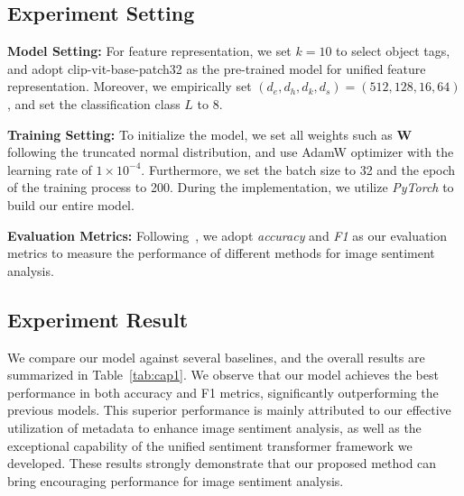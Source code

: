 \subsection{Experiment Setting}
% 
\textbf{Model Setting:}
For feature representation, we set $k=10$ to select object tags, and adopt clip-vit-base-patch32 as the pre-trained model for unified feature representation.
Moreover, we empirically set $(d_e, d_h, d_k, d_s) = (512, 128, 16, 64)$, and set the classification class $L$ to 8.

% 

\textbf{Training Setting:}
To initialize the model, we set all weights such as $\boldsymbol{W}$ following the truncated normal distribution, and use AdamW optimizer with the learning rate of $1 \times 10^{-4}$.
Furthermore, we set the batch size to 32 and the epoch of the training process to 200.
During the implementation, we utilize \textit{PyTorch} to build our entire model.

\textbf{Evaluation Metrics:}
Following~\cite{zhang2024affective, chen2024tgca, zhang2024object}, we adopt \textit{accuracy} and \textit{F1} as our evaluation metrics to measure the performance of different methods for image sentiment analysis. 



\subsection{Experiment Result}
We compare our model against several baselines, and the overall results are summarized in Table~\ref{tab:cap1}.
We observe that our model achieves the best performance in both accuracy and F1 metrics, significantly outperforming the previous models. 
This superior performance is mainly attributed to our effective utilization of metadata to enhance image sentiment analysis, as well as the exceptional capability of the unified sentiment transformer framework we developed. These results strongly demonstrate that our proposed method can bring encouraging performance for image sentiment analysis.

